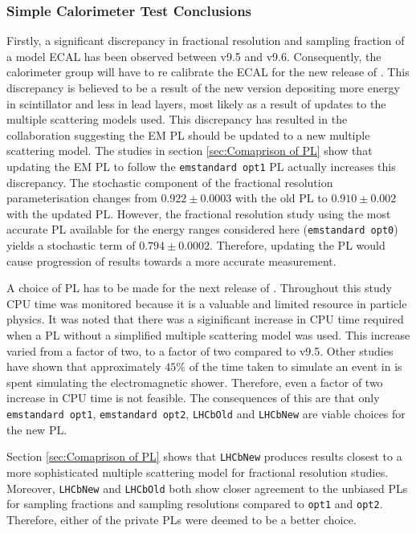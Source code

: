 \subsubsection{Simple Calorimeter Test Conclusions}
\label{ref:CaloConclusions}
Firstly, a significant discrepancy in fractional resolution and sampling fraction of a model \lhcb ECAL has been observed between \geant v9.5 and v9.6.  Consequently, the \lhcb calorimeter group will have to re calibrate the ECAL for the new release of \gauss. This discrepancy is believed to be a result of the new \geant version depositing more energy in scintillator and less in lead layers, most likely as a result of updates to the multiple scattering models used.  This discrepancy has resulted in the \geant collaboration suggesting the \lhcb EM PL should be updated to a new multiple scattering model.  The studies in section \ref{sec:Comaprison of PL} show that updating the \lhcb EM PL to follow the \texttt{emstandard opt1} PL actually increases this discrepancy. The stochastic component of the fractional resolution parameterisation changes from $0.922 \pm 0.0003$ with the old \lhcb PL to $0.910\pm 0.002$ with the updated \lhcb PL. However, the fractional resolution study using the most accurate PL available for the energy ranges considered here (\texttt{emstandard opt0}) yields a stochastic term of $0.794\pm0.0002$.  Therefore, updating the \lhcb PL would cause progression of results towards a more accurate measurement.

A choice of PL has to be made for the next release of \gauss.  Throughout this study CPU time was monitored because it is a valuable and limited resource in particle physics.  It was noted that there was a siginificant increase in CPU time required when a PL without a simplified multiple scattering model was used. This increase varied from a factor of two, to a factor of two compared to v9.5.  Other studies have shown that approximately $45\%$ of the time taken to simulate an event in \gauss is spent simulating the electromagnetic shower.  Therefore, even a factor of two increase in CPU time is not feasible.  The consequences of this are that only \texttt{emstandard opt1}, \texttt{emstandard opt2}, \texttt{LHCbOld} and \texttt{LHCbNew} are viable choices for the new PL.

Section \ref{sec:Comaprison of PL} shows that \texttt{LHCbNew} produces results closest to a more sophisticated multiple scattering model for fractional resolution studies.  Moreover, \texttt{LHCbNew} and \texttt{LHCbOld} both show closer agreement to the unbiased PLs for sampling fractions and sampling resolutions compared to \texttt{opt1} and \texttt{opt2}.  Therefore, either of the \lhcb private PLs were deemed to be a better choice. 

